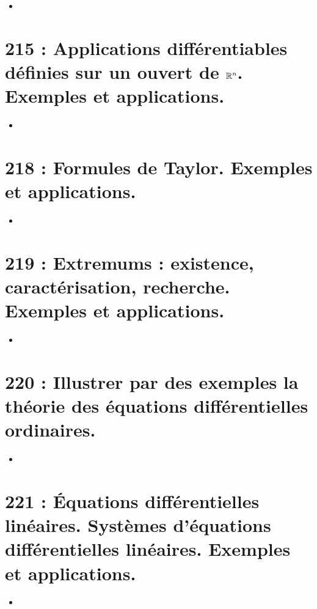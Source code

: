 \documentclass[a4paper,10pt,oneside,twocolumn,landscape]{book}
\begin{document}
\begin{itemize}
	\item 
\end{itemize}

\section{215 : Applications différentiables définies sur un ouvert de $\mathbb{R}^n$. Exemples et applications.}

\begin{itemize}
	\item 
\end{itemize}

\section{218 : Formules de Taylor. Exemples et applications.}

\begin{itemize}
	\item 
\end{itemize}

\section{219 : Extremums : existence, caractérisation, recherche. Exemples et applications.}

\begin{itemize}
	\item 
\end{itemize}

\section{220 : Illustrer par des exemples la théorie des équations différentielles ordinaires.}

\begin{itemize}
	\item 
\end{itemize}

\section{221 : Équations différentielles linéaires. Systèmes d’équations différentielles linéaires. Exemples et applications.}

\begin{itemize}
	\item 
\end{itemize}
\end{document}
